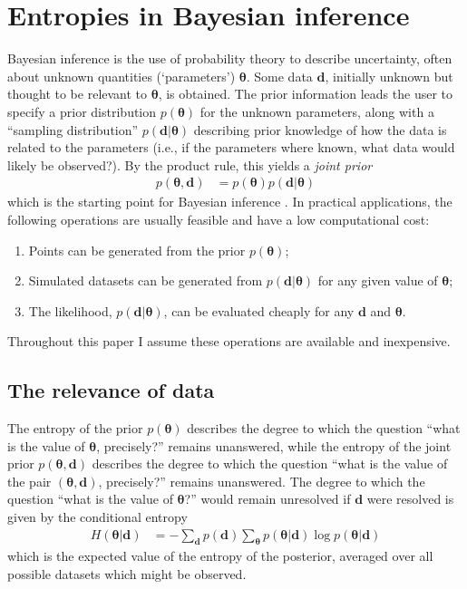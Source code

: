 \documentclass[entropy,article,accept,oneauthor,pdftex,10pt,a4paper]{mdpi}
\renewcommand{\d}{\boldsymbol{d}}
\newcommand{\x}{\boldsymbol{\theta}}
\begin{document}
\section{Entropies in Bayesian inference}

Bayesian inference is the use of probability theory to
describe uncertainty, often about unknown quantities
(`parameters') $\x$. Some data $\d$, initially unknown but
thought to be relevant to $\x$, is obtained.
The prior information leads the
user to specify a prior distribution $p(\x)$ for the unknown parameters,
along with a ``sampling distribution'' $p(\d | \x)$ describing prior knowledge
of how the data is related to the parameters
(i.e., if the parameters where known, what data would likely be observed?).
By the product rule, this yields a {\em joint prior}
\begin{align}
p(\x, \d) &= p(\x)p(\d | \x)
\end{align}
which is the starting point for
Bayesian inference \citep{caticha2008lectures}.
In practical applications, the following operations
are usually feasible and have a low computational cost:
\begin{enumerate}
  \item Points can be generated from the prior $p(\x)$;
  \item Simulated datasets can be generated from $p(\d | \x)$ for any
        given value of $\x$;
  \item The likelihood, $p(\d | \x)$, can be evaluated cheaply for any
        $\d$ and $\x$.
\end{enumerate}
Throughout this paper I assume these operations are available and inexpensive.

\subsection{The relevance of data}

The entropy of the prior $p(\x)$ describes the degree to which the question
``what is the value of $\x$, precisely?'' remains unanswered, while the
entropy of the joint prior $p(\x, \d)$
describes the degree to which the question
``what is the value of the pair $(\x, \d)$, precisely?'' remains unanswered.
The degree to which the question ``what is the value of $\x$?'' would remain
unresolved if $\d$ were resolved is given by the
conditional entropy
\begin{align}
H(\x | \d) &= - \sum_{\d} p(\d) \sum_{\x} p(\x | \d) \log p(\x | \d)
\end{align}
which is the expected value of the entropy of the posterior, averaged over
all possible datasets which might be observed. 
\end{document}
